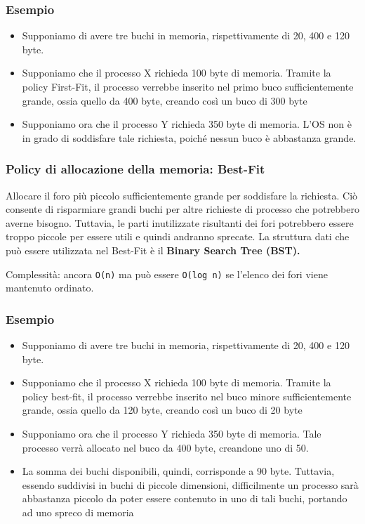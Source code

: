 \documentclass{article}
\begin{document}
\subsubsection{Esempio}
\begin{itemize}
    \item Supponiamo di avere tre buchi in memoria, rispettivamente di 20, 400 e 120 byte.
    \item Supponiamo che il processo X richieda 100 byte di memoria. Tramite la policy First-Fit, il processo verrebbe inserito nel primo buco sufficientemente grande, ossia quello da 400 byte, creando così un buco di 300 byte
    \item Supponiamo ora che il processo Y richieda 350 byte di memoria. L'OS non è in grado di soddisfare tale richiesta, poiché nessun buco è abbastanza grande.
\end{itemize}

\subsubsection{Policy di allocazione della memoria: Best-Fit}
Allocare il foro più piccolo sufficientemente grande per soddisfare la richiesta. Ciò consente di risparmiare grandi buchi per altre richieste di processo che potrebbero averne bisogno. Tuttavia, le parti inutilizzate risultanti dei fori potrebbero essere troppo piccole per essere utili e quindi andranno sprecate. La struttura dati che può essere utilizzata nel Best-Fit è il \textbf{Binary Search Tree (BST).}\par
Complessità: ancora \texttt{O(n)} ma può essere \texttt{O(log n)} se l'elenco dei fori viene mantenuto ordinato. 
\pagebreak
\subsubsection{Esempio}
\begin{itemize}
    \item Supponiamo di avere tre buchi in memoria, rispettivamente di 20, 400 e 120 byte.
    \item Supponiamo che il processo X richieda 100 byte di memoria. Tramite la policy best-fit, il processo verrebbe inserito nel buco minore sufficientemente grande, ossia quello da 120 byte, creando così un buco di 20 byte
    \item Supponiamo ora che il processo Y richieda 350 byte di memoria. Tale processo verrà allocato nel buco da 400 byte, creandone uno di 50.
    \item La somma dei buchi disponibili, quindi, corrisponde a 90 byte. Tuttavia, essendo suddivisi in buchi di piccole dimensioni, difficilmente un processo sarà abbastanza piccolo da poter essere contenuto in uno di tali buchi, portando ad uno spreco di memoria
\end{itemize}
    
\end{document}
